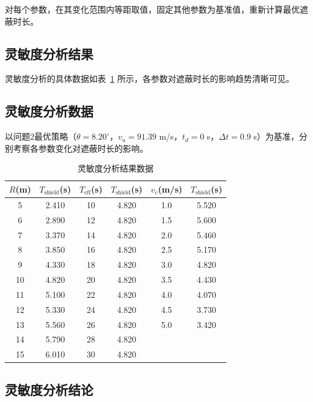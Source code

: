 \documentclass[12pt,a4paper]{article}
\begin{document}
对每个参数，在其变化范围内等距取值，固定其他参数为基准值，重新计算最优遮蔽时长。

\subsection{灵敏度分析结果}

灵敏度分析的具体数据如表~\ref{tab:sensitivity_data} 所示，各参数对遮蔽时长的影响趋势清晰可见。

\subsection{灵敏度分析数据}

以问题2最优策略（$\theta = 8.20^\circ$，$v_u = 91.39$ m/s，$t_d = 0$ s，$\Delta t = 0.9$ s）为基准，分别考察各参数变化对遮蔽时长的影响。

\begin{table}[H]
    \centering
    \caption{灵敏度分析结果数据}
    \label{tab:sensitivity_data}
    \begin{tabular}{cccccc}
        \toprule
        $R$(m) & $T_{\text{shield}}$(s) & $T_{\text{eff}}$(s) & $T_{\text{shield}}$(s) & $v_c$(m/s) & $T_{\text{shield}}$(s) \\
        \midrule
        5  & 2.410 & 10 & 4.820 & 1.0 & 5.520 \\
        6  & 2.890 & 12 & 4.820 & 1.5 & 5.600 \\
        7  & 3.370 & 14 & 4.820 & 2.0 & 5.460 \\
        8  & 3.850 & 16 & 4.820 & 2.5 & 5.170 \\
        9  & 4.330 & 18 & 4.820 & 3.0 & 4.820 \\
        10 & 4.820 & 20 & 4.820 & 3.5 & 4.430 \\
        11 & 5.100 & 22 & 4.820 & 4.0 & 4.070 \\
        12 & 5.330 & 24 & 4.820 & 4.5 & 3.730 \\
        13 & 5.560 & 26 & 4.820 & 5.0 & 3.420 \\
        14 & 5.790 & 28 & 4.820 &  &  \\
        15 & 6.010 & 30 & 4.820 &  &  \\
        \bottomrule
    \end{tabular}
\end{table}

\subsection{灵敏度分析结论}
\end{document}
